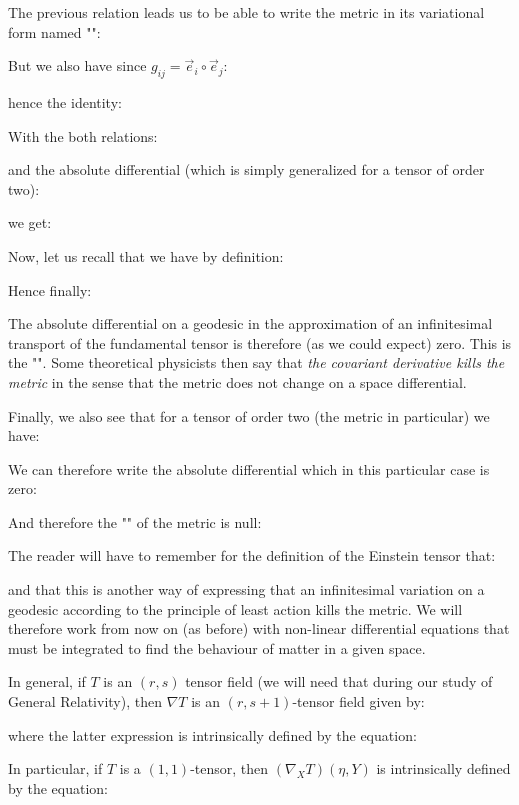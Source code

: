 	The previous relation leads us to be able to write the metric in its variational form named "":
	
	But we also have since $g_{ij}=\vec{e}_i\circ\vec{e}_j$:
	
	hence the identity:
	
	With the both relations:
	
	and the absolute differential (which is simply generalized for a tensor of order two):
	
	we get:
	
	Now, let us recall that we have by definition:
	
	Hence finally:
	
	The absolute differential on a geodesic in the approximation of an infinitesimal transport of the fundamental tensor is therefore (as we could expect) zero. This is the "". Some theoretical physicists then say that \og \textit{the covariant derivative kills the metric} \fg{} in the sense that the metric does not change on a space differential.

	Finally, we also see that for a tensor of order two (the metric in particular) we have:
	
	We can therefore write the absolute differential which in this particular case is zero:
	
	And therefore the "" of the metric is null:
	
	\begin{tcolorbox}[title=Remark,colframe=black,arc=10pt]
	The reader will have to remember for the definition of the Einstein tensor that:
	
	and that this is another way of expressing that an infinitesimal variation on a geodesic according to the principle of least action kills the metric. We will therefore work from now on (as before) with non-linear differential equations that must be integrated to find the behaviour of matter in a given space.
	\end{tcolorbox}
	In general, if $T$ is an $(r,s)$ tensor field (we will need that during our study of General Relativity), then $\nabla T$ is an $(r,s+1)$-tensor field given by:
	
	where the latter expression is intrinsically defined by the equation:
	
	In particular, if $T$ is a $(1,1)$-tensor, then $(\nabla_X T)(\eta,Y)$ is intrinsically defined by the equation:
	
